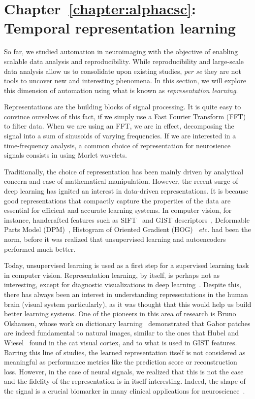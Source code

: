 \section*{Chapter~\ref{chapter:alphacsc}: Temporal representation learning}

So far, we studied automation in neuroimaging with the objective of enabling scalable data analysis and reproducibility. While  reproducibility and large-scale data analysis allow us to consolidate upon existing studies, \emph{per se} they are not tools to uncover new and interesting phenomena. In this section, we will explore this dimension of automation using what is known as \emph{representation learning}.

Representations are the building blocks of signal processing. It is quite easy to convince ourselves of this fact, if we simply use a Fast Fourier Transform (FFT) to filter data. When we are using an FFT, we are in effect, decomposing the signal into a sum of sinusoids of varying frequencies. If we are interested in a time-frequency analysis, a common choice of representation for neurosience signals consists in using Morlet wavelets.

Traditionally, the choice of representation has been mainly driven by analytical concern and ease of mathematical manipulation. However, the recent surge of deep learning has ignited an interest in data-driven representations. It is because good representations  that compactly capture the properties of the data are essential for efficient and accurate learning systems. In computer vision, for instance, handcrafted features such as SIFT~\citep{lowe1999object} and GIST descriptors~\citep{oliva2001modeling}, Deformable Parts Model (DPM)~\citep{felzenszwalb2010object}, Histogram of Oriented Gradient (HOG)~\citep{dalal2005histograms} \emph{etc.} had been the norm, before it was realized that unsupervised learning and autoencoders performed much better.

Today, unsupervised learning is used as a first step for a supervised learning task in computer vision. Representation learning, by itself, is perhaps not as interesting, except for diagnostic visualizations in deep learning~\citep{zeiler2014visualizing}. Despite this, there has always been an interest in understanding representations in the human brain (visual system particularly), as it was thought that this would help us build better learning systems. One of the pioneers in this area of research is Bruno Olshausen, whose work on dictionary learning~\citep{olshausen1996emergence} demonstrated that Gabor patches are indeed fundamental to natural images, similar to the ones that Hubel and Wiesel~\citep{hubel1962receptive, marcelja1980mathematical} found in the cat visual cortex, and to what is used in GIST features. Barring this line of studies, the learned representation itself is not considered as meaningful as performance metrics like the prediction score or reconstruction loss. However, in the case of neural signals, we realized that this is not the case and the fidelity of the representation is in itself interesting. Indeed, the shape of the signal is a crucial biomarker in many clinical applications for neuroscience~\citep{cole2017brain}. 

